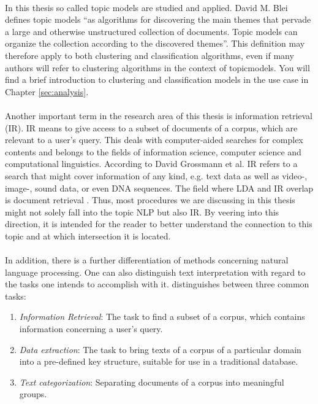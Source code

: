 \documentclass[11pt,a4paper]{article}
\begin{document}
\ \\
In this thesis so called topic models are studied and applied. David M. Blei defines topic models ``as algorithms for discovering the main themes that pervade a large and otherwise unstructured collection of documents. Topic models can organize the collection according to the discovered themes”\cite{Blei2012}. This definition may therefore apply to both clustering and classification algorithms, even if many authors will refer to clustering algorithms in the context of topicmodels. You will find a brief introduction to clustering and classification models in the use case in Chapter \ref{sec:analysis}.\\
\ \\
Another important term in the research area of this thesis is information retrieval (IR). IR means to give access to a subset of documents of a corpus, which are relevant to a user’s query. This deals with computer-aided searches for complex contents and belongs to the fields of information science, computer science and computational linguistics. According to David Grossmann et al. IR refers to a search that might cover information of any kind, e.g. text data as well as video-, image-, sound data, or even DNA sequences. The field where LDA and IR overlap is document retrieval \cite{Grossmann2004}. Thus, most procedures we are discussing in this thesis might not solely fall into the topic NLP but also IR. By veering into this direction, it is intended for the reader to better understand the connection to this topic and at which intersection it is located. \\
\ \\
In addition, there is a further differentiation of methods concerning natural language processing. One can also distinguish text interpretation with regard to the tasks one intends to accomplish with it. \cite{Jacobs1993} distinguishes between three common tasks:
\begin{enumerate}
	\item \textit{Information Retrieval}: The task to find a subset of a corpus, which contains information concerning a user’s query.

	\item \textit{Data extraction}: The task to bring texts of a corpus of a particular domain into a pre-defined key structure, suitable for use in a traditional database.

	\item \textit{Text categorization}: Separating documents of a corpus into meaningful groups.
\end{enumerate}
\end{document}
